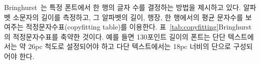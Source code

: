 Bringhurst~\cite{BRINGHURST99}는 
특정 폰트에서 한 행의 글자 수를 결정하는 방법을 제시하고 있다. 알파벳 소문자의 길이를 측정하고, 그
알파벳의 길이, 행장, 한 행에서의 평균 문자수를 보여주는 적정문자수표(copyfitting table)를 이용한다.
표~\ref{tab:copyfitting}\는 Bringhurst의 적정문자수표를 축약한
것이다. 예를 들면 130포인트 길이의 폰트는 단단 텍스트에서는 약 26pc 척도로
설정되어야 하고 다단 텍스트에서는 18pc 너비의 단으로 구성되어야 한다.
 

